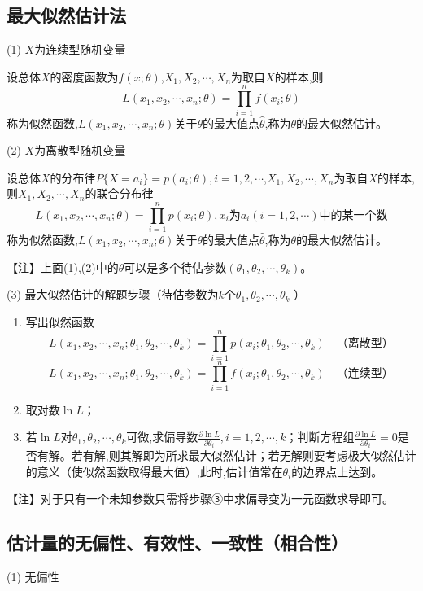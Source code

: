 \documentclass[UTF8]{ctexart}
\theoremstyle{remark}
\begin{document}
		\subsection{最大似然估计法}

		(1) \(X\)为连续型随机变量
		
		设总体\(X\)的密度函数为\(f(x;\theta)\),\(X_1,X_2,\cdots,X_n\)为取自\(X\)的样本,则
		\[
		L(x_1,x_2,\cdots,x_n;\theta)=\prod_{i = 1}^{n}f(x_i;\theta)
		\]
		称为似然函数,\(L(x_1,x_2,\cdots,x_n;\theta)\)关于\(\theta\)的最大值点\(\hat{\theta}\),称为\(\theta\)的最大似然估计。
		
		(2) \(X\)为离散型随机变量
		
		设总体\(X\)的分布律\(P\{X = a_i\} = p(a_i;\theta), i = 1,2,\cdots\),\(X_1,X_2,\cdots,X_n\)为取自\(X\)的样本,则\(X_1,X_2,\cdots,X_n\)的联合分布律
		\[
		L(x_1,x_2,\cdots,x_n;\theta)=\prod_{i = 1}^{n}p(x_i;\theta),x_i为a_i (i = 1,2,\cdots)中的某一个数
		\]
		称为似然函数,\(L(x_1,x_2,\cdots,x_n;\theta)\)关于\(\theta\)的最大值点\(\hat{\theta}\),称为\(\theta\)的最大似然估计。
		
		【注】上面(1),(2)中的\(\theta\)可以是多个待估参数\((\theta_1,\theta_2,\cdots,\theta_k)\)。
		
		(3) 最大似然估计的解题步骤（待估参数为\(k\)个\(\theta_1,\theta_2,\cdots,\theta_k\) ）
		\begin{enumerate}
			\item 写出似然函数
			\[
			L(x_1,x_2,\cdots,x_n;\theta_1,\theta_2,\cdots,\theta_k)=\prod_{i = 1}^{n}p(x_i;\theta_1,\theta_2,\cdots,\theta_k) \quad \text{（离散型）}
			\]
			\[
			L(x_1,x_2,\cdots,x_n;\theta_1,\theta_2,\cdots,\theta_k)=\prod_{i = 1}^{n}f(x_i;\theta_1,\theta_2,\cdots,\theta_k) \quad \text{（连续型）}
			\]
			\item 取对数\(\ln L\)；
			\item 若\(\ln L\)对\(\theta_1,\theta_2,\cdots,\theta_k\)可微,求偏导数\(\frac{\partial \ln L}{\partial \theta_i}, i = 1,2,\cdots,k\)；判断方程组\(\frac{\partial \ln L}{\partial \theta_i}=0\)是否有解。若有解,则其解即为所求最大似然估计；若无解则要考虑极大似然估计的意义（使似然函数取得最大值）,此时,估计值常在\(\theta_i\)的边界点上达到。
		\end{enumerate}
		【注】对于只有一个未知参数只需将步骤③中求偏导变为一元函数求导即可。
		
		\subsection{估计量的无偏性、有效性、一致性（相合性）}
		(1) 无偏性
		
\end{document}
